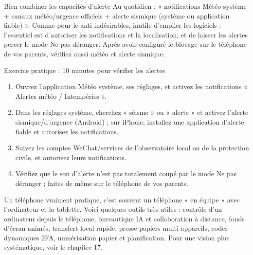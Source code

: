 \begin{tcbinfo}{Bien combiner les capacités d'alerte}
Au quotidien : « notifications Météo système + canaux météo/urgence officiels + alerte sismique (système ou application fiable) ». Comme pour le anti-indésirables, inutile d'empiler les logiciels : l'essentiel est d'autoriser les notifications et la localisation, et de laisser les alertes percer le mode Ne pas déranger. Après avoir configuré le blocage sur le téléphone de vos parents, vérifiez aussi météo et alerte sismique.

\end{tcbinfo}

\begin{tcbpractice}{Exercice pratique : 10 minutes pour vérifier les alertes}
\begin{enumerate}
  \item Ouvrez l'application Météo système, ses réglages, et activez les notifications « Alertes météo / Intempéries ».
  \item Dans les réglages système, cherchez « séisme » ou « alerte » et activez l'alerte sismique/d'urgence (Android) ; sur iPhone, installez une application d'alerte fiable et autorisez les notifications.
  \item Suivez les comptes WeChat/services de l'observatoire local ou de la protection civile, et autorisez leurs notifications.
  \item Vérifiez que le son d'alerte n'est pas totalement coupé par le mode Ne pas déranger ; faites de même sur le téléphone de vos parents.
\end{enumerate}

\end{tcbpractice}


Un téléphone vraiment pratique, c'est souvent un téléphone « en équipe » avec l'ordinateur et la tablette. Voici quelques outils très utiles : contrôle d'un ordinateur depuis le téléphone, bureautique IA et collaboration à distance, fonds d'écran animés, transfert local rapide, presse-papiers multi-appareils, codes dynamiques 2FA, numérisation papier et planification. Pour une vision plus systématique, voir le chapitre 17.


